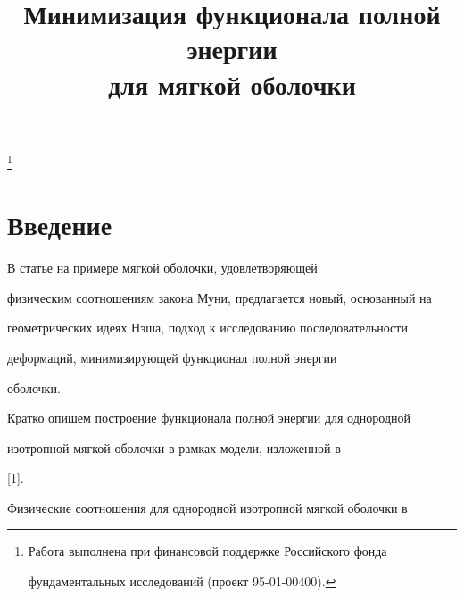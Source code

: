 \title{Минимизация функционала полной энергии \\


для мягкой оболочки}





\thanks{Работа выполнена при финансовой поддержке Российского фонда


фундаментальных исследований (проект 95-01-00400).}


\date{}







\pagestyle{plain} %













\maketitle


\label{begin}


\section{Введение}





В статье на примере мягкой оболочки, удовлетворяющей


физическим соотношениям закона Муни, предлагается новый, основанный на


геометрических идеях Нэша, подход к исследованию последовательности


деформаций, минимизирующей функционал полной энергии


оболочки.





Кратко опишем построение функционала полной энергии для однородной


изотропной мягкой оболочки в рамках модели, изложенной в


[1].





Физические соотношения для однородной изотропной мягкой оболочки в


